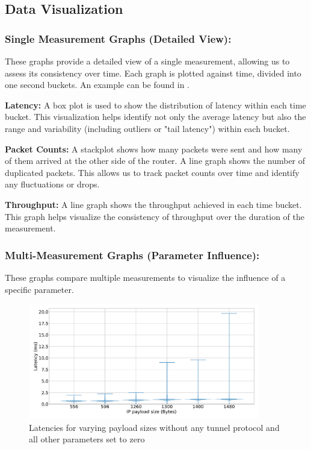 \subsection{Data Visualization}
\subsubsection{Single Measurement Graphs (Detailed View):}
\label{sect:graphs-single}
These graphs provide a detailed view of a single measurement, allowing us to assess its consistency over time.
Each graph is plotted against time, divided into one second buckets.
An example can be found in .

\noindent\textbf{Latency:} A box plot is used to show the distribution of latency within each time bucket.
This visualization helps identify not only the average latency but also the range and variability (including outliers or "tail latency") within each bucket.

\noindent\textbf{Packet Counts:} A stackplot shows how many packets were sent and how many of them arrived at the other side of the router.
A line graph shows the number of duplicated packets.
This allows us to track packet counts over time and identify any fluctuations or drops.

\noindent\textbf{Throughput:} A line graph shows the throughput achieved in each time bucket.
This graph helps visualize the consistency of throughput over the duration of the measurement.


\subsubsection{Multi-Measurement Graphs (Parameter Influence):}
\label{sect:graphs-multi}
These graphs compare multiple measurements to visualize the influence of a specific parameter.

\begin{figure}[tbh]
	\centering
	\includegraphics[draft=false,width=0.9\textwidth]{figures/Graphs/graph-4-mtu/latencies.pdf}
	\caption{Latencies for varying payload sizes without any tunnel protocol and all other parameters set to zero}
	\label{fig:graph-4-mtu-latencies}
\end{figure}

